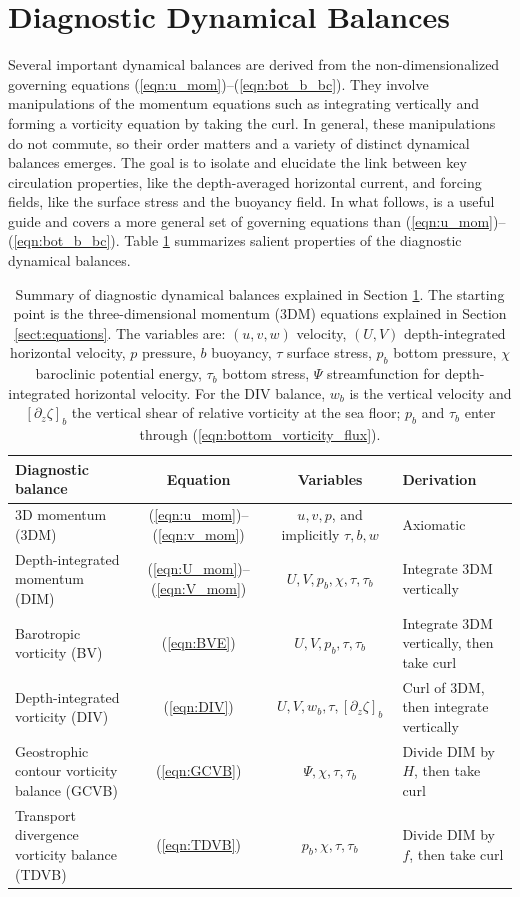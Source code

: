 \documentclass{ametsocV6.2}
\begin{document}
\section{Diagnostic Dynamical Balances}
\label{sect:dynamical_balances}
Several important dynamical balances are derived from the non-dimensionalized governing equations (\ref{eqn:u_mom})--(\ref{eqn:bot_b_bc}).
They involve manipulations of the momentum equations such as integrating vertically and forming a vorticity equation by taking the curl.
In general, these manipulations do not commute, so their order matters and a variety of distinct dynamical balances emerges.
The goal is to isolate and elucidate the link between key circulation properties, like the depth-averaged horizontal current, and forcing fields, like the surface stress and the buoyancy field.
In what follows, \citet{waldman&giordani23} is a useful guide and covers a more general set of governing equations than (\ref{eqn:u_mom})--(\ref{eqn:bot_b_bc}).
Table \ref{tab:dynamical_balances} summarizes salient properties of the diagnostic dynamical balances.


\begin{table}
\centering
\begin{tabular}{lccl}
\hline
Diagnostic balance & Equation & Variables & Derivation \\
\hline
3D momentum (3DM)    & (\ref{eqn:u_mom})--(\ref{eqn:v_mom}) & $u, v, p$, and implicitly $\tau, b, w$ & Axiomatic \\
Depth-integrated momentum (DIM)    & (\ref{eqn:U_mom})--(\ref{eqn:V_mom}) & $U, V, p_b, \chi, \tau, \tau_b$ & Integrate 3DM vertically \\
Barotropic vorticity (BV)   & (\ref{eqn:BVE}) & $U, V, p_b, \tau, \tau_b$ & Integrate 3DM  vertically, then take curl\\
Depth-integrated vorticity (DIV)   & (\ref{eqn:DIV}) & $U, V, w_b, \tau, [\partial_z \zeta]_b$ & Curl of 3DM, then integrate vertically \\
Geostrophic contour vorticity balance (GCVB)   & (\ref{eqn:GCVB}) & $\Psi, \chi, \tau, \tau_b$ & Divide DIM by $H$, then take curl \\
Transport divergence vorticity balance (TDVB)   & (\ref{eqn:TDVB}) & $p_b, \chi, \tau, \tau_b$ & Divide DIM by $f$, then take curl \\
\hline
\end{tabular}
\vspace{6pt}
\caption{\label{tab:dynamical_balances} Summary of diagnostic dynamical balances explained in Section \ref{sect:dynamical_balances}.
The starting point is the three-dimensional momentum (3DM) equations explained in Section \ref{sect:equations}.
The variables are: $(u,v,w)$ velocity, $(U,V)$ depth-integrated horizontal velocity, $p$ pressure, $b$ buoyancy, $\tau$ surface stress, $p_b$ bottom pressure, $\chi$ baroclinic potential energy, $\tau_b$ bottom stress, $\Psi$ streamfunction for depth-integrated horizontal velocity. For the DIV balance, $w_b$ is the vertical velocity and $[\partial_z \zeta]_b$ the vertical shear of relative vorticity at the sea floor; $p_b$ and $\tau_b$ enter through (\ref{eqn:bottom_vorticity_flux}).}
\end{table}
\end{document}
